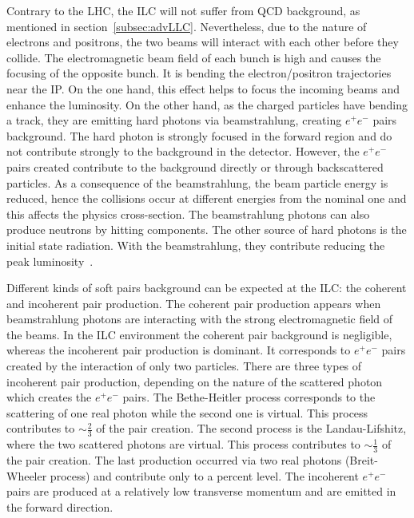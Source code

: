     Contrary to the \gls{LHC}, the \gls{ILC} will not suffer from QCD background, as mentioned in section~\ref{subsec:advLLC}.
    Nevertheless, due to the nature of electrons and positrons, the two beams will interact with each other before they collide.
    The electromagnetic beam field of each bunch is high and causes the focusing of the opposite bunch.
    It is bending the electron/positron trajectories near the \gls{IP}.
    On the one hand, this effect helps to focus the incoming beams and enhance the luminosity.
    On the other hand, as the charged particles have bending a track, they are emitting hard photons via beamstrahlung, creating $e^+e^-$ pairs background.
    The hard photon is strongly focused in the forward region and do not contribute strongly to the background in the detector.
    However, the $e^+e^-$ pairs created contribute to the background directly or through backscattered particles.
    As a consequence of the beamstrahlung, the beam particle energy is reduced, hence the collisions occur at different energies from the nominal one and this affects the physics cross-section.
    The beamstrahlung photons can also produce neutrons by hitting components.
    The other source of hard photons is the initial state radiation. 
    With the beamstrahlung, they contribute reducing the peak luminosity~\cite{Markin2014}.

    Different kinds of soft pairs background can be expected at the \gls{ILC}: the coherent and incoherent pair production.
    The coherent pair production appears when beamstrahlung photons are interacting with the strong electromagnetic field of the beams.
    In the \gls{ILC} environment the coherent pair background is negligible, whereas the incoherent pair production is dominant.
    It corresponds to $e^+e^-$ pairs created by the interaction of only two particles.
    There are three types of incoherent pair production, depending on the nature of the scattered photon which creates the $e^{+}e^{-}$ pairs.
    The Bethe-Heitler process corresponds to the scattering of one real photon while the second one is virtual.
    This process contributes to $\sim \frac{2}{3}$ of the pair creation.
    The second process is the Landau-Lifshitz, where the two scattered photons are virtual.
    This process contributes to $\sim \frac{1}{3}$ of the pair creation.
    The last production occurred via two real photons (Breit-Wheeler process) and contribute only to a percent level.
    The incoherent $e^+e^-$ pairs are produced at a relatively low transverse momentum and are emitted in the forward direction.
    

